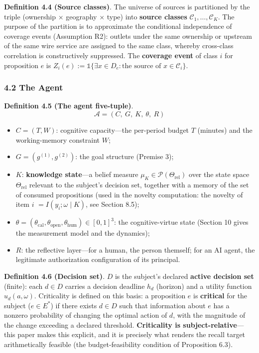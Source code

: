 \documentclass[
  11pt]{article}
\providecommand{\tightlist}{%
  \setlength{\itemsep}{0pt}\setlength{\parskip}{0pt}}
\begin{document}
\textbf{Definition 4.4 (Source classes)}. The universe of sources is
partitioned by the triple (ownership × geography × type) into
\textbf{source classes} \(\mathcal{C}_1, \dots, \mathcal{C}_K\). The
purpose of the partition is to approximate the conditional independence
of coverage events (Assumption R2): outlets under the same ownership or
upstream of the same wire service are assigned to the same class,
whereby cross-class correlation is constructively suppressed. The
\textbf{coverage event} of class \(i\) for proposition \(e\) is
\(Z_i(e) := \mathbb{1}\{\exists x \in D_e: \text{the source of } x \in \mathcal{C}_i\}\).

\subsubsection{4.2 The Agent}\label{the-agent}

\textbf{Definition 4.5 (The agent five-tuple)}.
\[\mathcal{A} = (C,\ G,\ K,\ \theta,\ R)\]

\begin{itemize}
\tightlist
\item
  \(C = (T, W)\): cognitive capacity---the per-period budget \(T\)
  (minutes) and the working-memory constraint \(W\);
\item
  \(G = (g^{(1)}, g^{(2)})\): the goal structure (Premise 3);
\item
  \(K\): \textbf{knowledge state}---a belief measure
  \(\mu_K \in \mathcal{P}(\Theta_{\mathrm{rel}})\) over the state space
  \(\Theta_{\mathrm{rel}}\) relevant to the subject's decision set,
  together with a memory of the set of consumed propositions (used in
  the novelty computation: the novelty of item \(i\)
  \(= I(y_i; \omega \mid K)\), see Section 8.5);
\item
  \(\theta = (\theta_{\mathrm{cal}}, \theta_{\mathrm{open}}, \theta_{\mathrm{hum}}) \in [0,1]^3\):
  the cognitive-virtue state (Section 10 gives the measurement model and
  the dynamics);
\item
  \(R\): the reflective layer---for a human, the person themself; for an
  AI agent, the legitimate authorization configuration of its principal.
\end{itemize}

\textbf{Definition 4.6 (Decision set)}. \(D\) is the subject's declared
\textbf{active decision set} (finite): each \(d \in D\) carries a
decision deadline \(h_d\) (horizon) and a utility function
\(u_d(a, \omega)\). Criticality is defined on this basis: a proposition
\(e\) is \textbf{critical} for the subject (\(e \in E^*\)) if there
exists \(d \in D\) such that information about \(e\) has a nonzero
probability of changing the optimal action of \(d\), with the magnitude
of the change exceeding a declared threshold. \textbf{Criticality is
subject-relative}---this paper makes this explicit, and it is precisely
what renders the recall target arithmetically feasible (the
budget-feasibility condition of Proposition 6.3).
\end{document}
